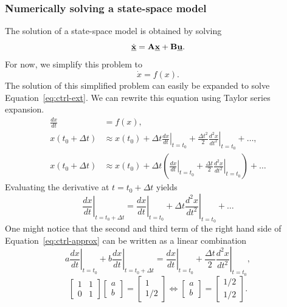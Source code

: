 \documentclass[11pt,titlepage]{report}
\begin{document}
\subsubsection{Numerically solving a state-space model}
The solution of a state-space model is obtained by solving
\begin{equation} \label{eq:ctrl-ext}
	\dot{\mathbf{\underline{x}}}=\mathbf{A}\mathbf{\underline{x}}+\mathbf{B}\mathbf{\underline{u}}.
\end{equation}
For now, we simplify this problem to
\begin{equation*}
	\dot{x}=f(x).
\end{equation*}
The solution of this simplified problem can easily be expanded to solve Equation~\ref{eq:ctrl-ext}. We can rewrite this equation using Taylor series expansion.
\begin{align}
\frac{dx}{dt} &= f(x), \nonumber \\
x(t_0+\Delta t) &\approx
x(t_0)+
\left. \Delta t \frac{dx}{dt} \right|_{t=t_0}+
\frac{\Delta t^2}{2}\left. \frac{d^2x}{dt^2} \right|_{t=t_0}+
\dots, \nonumber \\
x(t_0+\Delta t) &\approx
x(t_0)+
\Delta t \left(
\left. \frac{dx}{dt} \right|_{t=t_0}+
\frac{\Delta t}{2}\left. \frac{d^2x}{dt^2} \right|_{t=t_0}
\right) + \dots \label{eq:ctrl-approx}
\end{align}
Evaluating the derivative at $t=t_0+\Delta t$ yields
\begin{equation*}
\left. \frac{dx}{dt} \right|_{t=t_0+\Delta t} =
\left. \frac{dx}{dt} \right|_{t=t_0} +
\Delta t \left. \frac{d^2x}{dt^2} \right|_{t=t_0} + \dots
\end{equation*}
One might notice that the second and third term of the right hand side of Equation~\ref{eq:ctrl-approx} can be written as a linear combination
\begin{equation*}
a \left. \frac{dx}{dt} \right|_{t=t_0} +
b \left. \frac{dx}{dt} \right|_{t=t_0+\Delta t} =
\left. \frac{dx}{dt} \right|_{t=t_0}+
\frac{\Delta t}{2}\left. \frac{d^2x}{dt^2} \right|_{t=t_0},
\end{equation*}
\begin{equation*}
\begin{bmatrix}
1 & 1 \\
0 & 1
\end{bmatrix} \begin{bmatrix}
a \\
b
\end{bmatrix} = \begin{bmatrix}
1 \\
1/2
\end{bmatrix} \Leftrightarrow \begin{bmatrix}
a \\
b
\end{bmatrix} = \begin{bmatrix}
1/2 \\
1/2
\end{bmatrix}.
\end{equation*}
\end{document}
